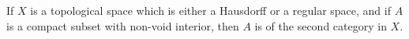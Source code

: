 If $X$ is a topological space which is either a Hausdorff or a regular space, and if $A$ is a compact subset with non-void interior, then $A$ is of the second category in $X$.
